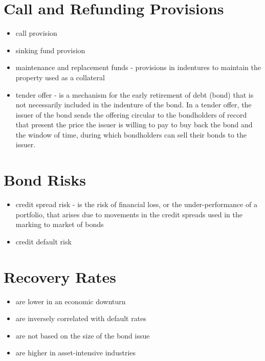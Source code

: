\section{Call and Refunding Provisions}
\begin{itemize}
	\item call provision
	\item sinking fund provision
	\item maintenance and replacement funds - provisions in indentures to maintain the property used as a collateral
	\item tender offer - is a mechanism for the early retirement of debt (bond) that is not necessarily included in the indenture of the bond. In a tender offer, the issuer of the bond sends the offering circular to the bondholders of record that present the price the issuer is willing to pay to buy back the bond and the window of time, during which bondholders can sell their bonds to the issuer.
\end{itemize}

\section{Bond Risks}
\begin{itemize}
	\item credit spread risk - is the risk of financial loss, or the under-performance of a portfolio, that arises due to movements in the credit spreads used in the marking to market of bonds
	\item credit default risk
\end{itemize}

\section{Recovery Rates}
\begin{itemize}
	\item are lower in an economic downturn
	\item are inversely correlated with default rates
	\item are not based on the size of the bond issue
	\item are higher in asset-intensive industries
\end{itemize}